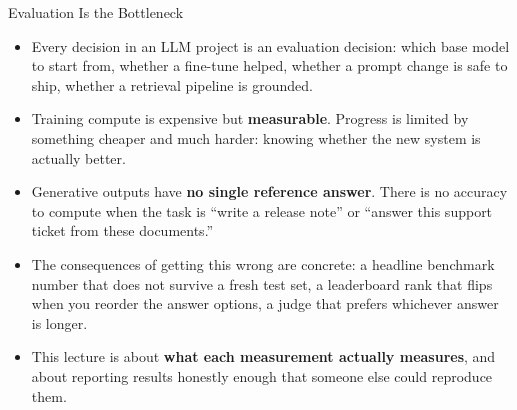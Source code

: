 \begin{frame}{Evaluation Is the Bottleneck}
  \begin{itemize}\itemsep0.45em
    \item[\textcolor{red}{$\blacktriangleright$}] Every decision in an LLM project is an evaluation decision: which base model to start from, whether a fine-tune helped, whether a prompt change is safe to ship, whether a retrieval pipeline is grounded.
    \item[\textcolor{red}{$\blacktriangleright$}] Training compute is expensive but \textbf{measurable}. Progress is limited by something cheaper and much harder: knowing whether the new system is actually better.
    \item[\textcolor{red}{$\blacktriangleright$}] Generative outputs have \textbf{no single reference answer}. There is no accuracy to compute when the task is ``write a release note'' or ``answer this support ticket from these documents.''
    \item[\textcolor{red}{$\blacktriangleright$}] The consequences of getting this wrong are concrete: a headline benchmark number that does not survive a fresh test set, a leaderboard rank that flips when you reorder the answer options, a judge that prefers whichever answer is longer.
    \item[\textcolor{red}{$\blacktriangleright$}] This lecture is about \textbf{what each measurement actually measures}, and about reporting results honestly enough that someone else could reproduce them.
  \end{itemize}
\end{frame}

